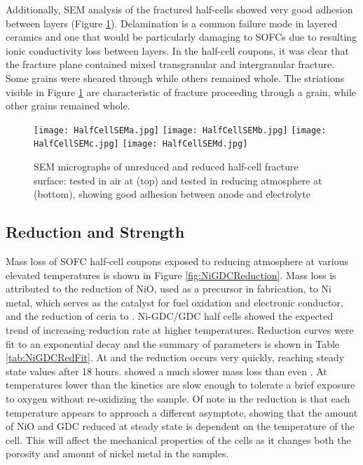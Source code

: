 Additionally, SEM analysis of the fractured half-cells showed very good adhesion between layers (Figure \ref{fig:HalfCellSEM}).
Delamination is a common failure mode in layered ceramics and one that would be particularly damaging to SOFCs due to resulting ionic conductivity loss between layers.\cite{Sevecek2016}
In the half-cell coupons, it was clear that the fracture plane contained mixed transgranular and intergranular fracture.
Some grains were sheared through while others remained whole.
The striations visible in Figure \ref{fig:HalfCellSEM} are characteristic of fracture proceeding through a grain, while other grains remained whole.
\begin{figure}
    \texttt{[image: HalfCellSEMa.jpg]}
    \texttt{[image: HalfCellSEMb.jpg]}
    \texttt{[image: HalfCellSEMc.jpg]}
    \texttt{[image: HalfCellSEMd.jpg]}
    \caption{SEM micrographs of unreduced and reduced half-cell fracture surface: tested in air at  (top) and tested in reducing atmosphere at  (bottom), showing good adhesion between anode and electrolyte}
    \label{fig:HalfCellSEM}
\end{figure}

\subsection{Reduction and Strength}

Mass loss of SOFC half-cell coupons exposed to reducing atmosphere at various elevated temperatures is shown in Figure \ref{fig:NiGDCReduction}.
Mass loss is attributed to the reduction of NiO, used as a precursor in fabrication,
to Ni metal, which serves as the catalyst for fuel oxidation and electronic conductor, and the reduction of ceria to .
Ni-GDC/GDC half cells showed the expected trend of increasing reduction rate at higher temperatures.
Reduction curves were fit to an exponential decay and the summary of parameters is shown in Table \ref{tab:NiGDCRedFit}.
At  and  the reduction occurs very quickly,
reaching steady state values after 18 hours.  showed a much slower mass loss than even .
At temperatures lower than  the kinetics are slow enough to tolerate a brief exposure to oxygen without re-oxidizing the sample.
Of note in the reduction is that each temperature appears to approach a different asymptote, showing that the amount of NiO and GDC reduced at steady state is dependent on the temperature of the cell.
This will affect the mechanical properties of the cells as it changes both the porosity and amount of nickel metal in the samples.

